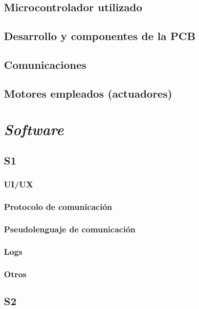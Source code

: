 \section{Microcontrolador utilizado}

\section{Desarrollo y componentes de la PCB}

\section{Comunicaciones}

\section{Motores empleados (actuadores)}


\chapter{\textit{Software}}

\section{S1}

\subsection{UI/UX}

\subsection{Protocolo de comunicación}

\subsection{Pseudolenguaje de comunicación}

\subsection{Logs}

\subsection{Otros}

\section{S2}

